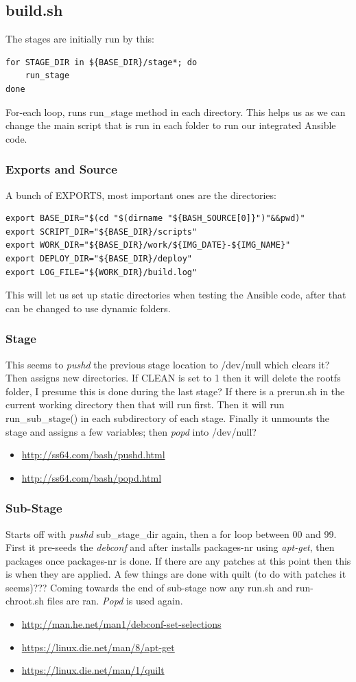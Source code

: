 \documentclass[12pt,a4paper]{report}
\begin{document}
\subsection{build.sh}
The stages are initially run by this:
\begin{lstlisting}[frame=single]
for STAGE_DIR in ${BASE_DIR}/stage*; do
	run_stage
done
\end{lstlisting}
For-each loop, runs run\_stage method in each directory. This helps us as we can change the main script that is run in each folder to run our integrated Ansible code.
\subsubsection{Exports and Source}
A bunch of EXPORTS, most important ones are the directories:
\begin{lstlisting}[frame=single]
export BASE_DIR="$(cd "$(dirname "${BASH_SOURCE[0]}")"&&pwd)"
export SCRIPT_DIR="${BASE_DIR}/scripts"
export WORK_DIR="${BASE_DIR}/work/${IMG_DATE}-${IMG_NAME}"
export DEPLOY_DIR="${BASE_DIR}/deploy"
export LOG_FILE="${WORK_DIR}/build.log"
\end{lstlisting}
This will let us set up static directories when testing the Ansible code, after that can be changed to use dynamic folders.
\subsubsection{Stage}
This seems to \textit{pushd} the previous stage location to /dev/null which clears it? Then assigns new directories. If CLEAN is set to 1 then it will delete the rootfs folder, I presume this is done during the last stage? If there is a prerun.sh in the current working directory then that will run first. Then it will run run\_sub\_stage() in each subdirectory of each stage. Finally it unmounts the stage and assigns a few variables; then \textit{popd} into /dev/null?
\begin{itemize}
\item{\url{http://ss64.com/bash/pushd.html}}
\item{\url{http://ss64.com/bash/popd.html}}
\end{itemize}
\subsubsection{Sub-Stage}
Starts off with \textit{pushd} sub\_stage\_dir again, then a for loop between 00 and 99. First it pre-seeds the \textit{debconf} and after installs packages-nr using \textit{apt-get}, then packages once packages-nr is done. If there are any patches at this point then this is when they are applied. A few things are done with quilt (to do with patches it seems)??? Coming towards the end of sub-stage now any run.sh and run-chroot.sh files are ran. \textit{Popd} is used again.
\begin{itemize}
\item{\url{http://man.he.net/man1/debconf-set-selections}}
\item{\url{https://linux.die.net/man/8/apt-get}}
\item{\url{https://linux.die.net/man/1/quilt}}
\end{itemize}
\end{document}
